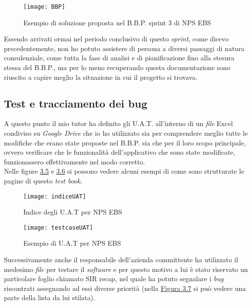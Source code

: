 \begin{figure}[h!]
\begin{center}
\texttt{[image: BBP]}
\caption{Esempio di soluzione proposta nel B.B.P. sprint 3 di NPS EBS}
\label{bbp}
\end{center}
\end{figure}
\FloatBarrier

Essendo arrivati ormai nel periodo conclusivo di questo \textit{sprint}, come dicevo precedentemente, non ho potuto assistere di persona a diversi passaggi di natura consulenziale, come tutta la fase di analisi e di pianificazione fino alla stesura stessa del B.B.P., ma per lo meno recuperando questa documentazione sono riuscito a capire meglio la situazione in cui il progetto si trovava. %

\subsection{Test e tracciamento dei bug}
\label{test}
A questo punto il mio tutor ha definito gli U.A.T. all'interno di un \textit{file} Excel condiviso su \textit{Google Drive} che io ho utilizzato sia per comprendere meglio tutte le modifiche che erano state proposte nel B.B.P. sia che per il loro scopo principale, ovvero verificare che le funzionalità dell'applicativo che sono state modificate, funzionassero effettivamente nel modo corretto. \\
Nelle figure \hyperref[indice UAT]{3.5} e \hyperref[test case]{3.6} si possono vedere alcuni esempi di come sono strutturate le pagine di questo \textit{test book}.

\begin{figure}[h!]
\begin{center}
\texttt{[image: indiceUAT]}
\caption{Indice degli U.A.T per NPS EBS}
\label{indice UAT}
\end{center}
\end{figure}
\FloatBarrier

\begin{figure}[h!]
\begin{center}
\texttt{[image: testcaseUAT]}
\caption{Esempio di U.A.T per NPS EBS}
\label{test case}
\end{center}
\end{figure}
\FloatBarrier

Successivamente anche il responsabile dell'azienda committente ha utilizzato il medesimo \textit{file} per testare il \textit{software} e per questo motivo a lui è stato riservato un particolare foglio chiamato SIR recap, nel quale ha potuto segnalare i \textit{bug} riscontrati assegnando ad essi diverse priorità (nella \hyperref[sir]{Figura 3.7} si può vedere una parte della lista da lui stilata).


